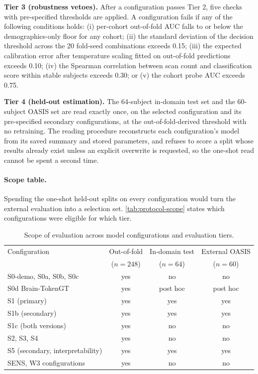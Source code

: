 \textbf{Tier 3 (robustness vetoes).} After a configuration passes Tier 2, five checks with
pre-specified thresholds are applied. A configuration fails if any of the following conditions
holds: (i) per-cohort out-of-fold \ac{AUC} falls to or below the demographics-only floor
for any cohort; (ii) the standard deviation of the decision threshold across the 20
fold-seed combinations exceeds 0.15; (iii) the expected calibration error after temperature
scaling fitted on out-of-fold predictions exceeds 0.10; (iv) the Spearman correlation
between scan count and classification score within stable subjects exceeds 0.30; or (v)
the cohort probe \ac{AUC} exceeds 0.75.

\textbf{Tier 4 (held-out estimation).} The 64-subject in-domain test set and the
60-subject \ac{OASIS} set are read exactly once, on the selected configuration and its pre-specified
secondary configurations, at the out-of-fold-derived threshold with no retraining.
The reading procedure reconstructs each configuration's model from its saved summary
and stored parameters, and refuses to score a split whose results already exist unless an
explicit overwrite is requested, so the one-shot read cannot be spent a second time.

\paragraph{Scope table.}
Spending the one-shot held-out splits on every configuration would turn the external
evaluation into a selection set. \autoref{tab:protocol-scope} states which configurations were eligible for
which tier.

\begin{table}[htbp]
\centering
\small
\caption{Scope of evaluation across model configurations and evaluation tiers.}
\label{tab:protocol-scope}
\begin{tabular}{@{}l ccc@{}}
\toprule
Configuration & Out-of-fold & In-domain test & External \ac{OASIS} \\
 & ($n=248$) & ($n=64$) & ($n=60$) \\
\midrule
S0-demo, S0a, S0b, S0c & yes & no & no \\
S0d Brain-TokenGT & yes & post hoc & post hoc \\
\addlinespace[3pt]
S1 (primary) & yes & yes & yes \\
S1b (secondary) & yes & yes & yes \\
S1c (both versions) & yes & no & no \\
\addlinespace[3pt]
S2, S3, S4 & yes & no & no \\
S5 (secondary, interpretability) & yes & yes & yes \\
SENS, W3 configurations & yes & no & no \\
\bottomrule
\end{tabular}
\end{table}

